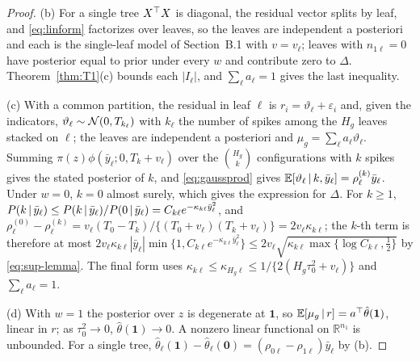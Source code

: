 \begin{proof}
(b) For a single tree $X^{\top} X$ is diagonal, the residual vector splits by leaf, and \eqref{eq:linform} factorizes over leaves, so the leaves are independent a posteriori and each is the single-leaf model of Section~B.1 with $v=v_\ell$; leaves with $n_{1\ell}=0$ have posterior equal to prior under every $w$ and contribute zero to $\Delta$. Theorem~\ref{thm:T1}(c) bounds each $|I_\ell|$, and $\sum_\ell a_\ell=1$ gives the last inequality.

(c) With a common partition, the residual in leaf $\ell$ is $r_i=\vartheta_\ell+\varepsilon_i$ and, given the indicators, $\vartheta_\ell\sim\mathcal{N}(0,T_{k_\ell})$ with $k_\ell$ the number of spikes among the $H_g$ leaves stacked on $\ell$; the leaves are independent a posteriori and $\mu_g=\sum_\ell a_\ell\vartheta_\ell$. Summing $\pi(z)\phi(\bar y_\ell;0,T_k+v_\ell)$ over the $\binom{H_g}{k}$ configurations with $k$ spikes gives the stated posterior of $k$, and \eqref{eq:gaussprod} gives $\mathbb{E}[\vartheta_\ell\,\vert\, k,\bar y_\ell]=\rho^{(k)}_\ell\bar y_\ell$. Under $w=0$, $k=0$ almost surely, which gives the expression for $\Delta$. For $k\ge1$, $P(k\,\vert\,\bar y_\ell)\le P(k\,\vert\,\bar y_\ell)/P(0\,\vert\,\bar y_\ell)=C_{k\ell}e^{-\kappa_{k\ell}\bar y_\ell^2}$, and $\rho^{(0)}_\ell-\rho^{(k)}_\ell=v_\ell(T_0-T_k)/\{(T_0+v_\ell)(T_k+v_\ell)\}=2v_\ell\kappa_{k\ell}$; the $k$-th term is therefore at most $2v_\ell\kappa_{k\ell}|\bar y_\ell|\min\{1,C_{k\ell}e^{-\kappa_{k\ell}\bar y_\ell^2}\}\le2v_\ell\sqrt{\kappa_{k\ell}\max\{\log C_{k\ell},\tfrac12\}}$ by \eqref{eq:sup-lemma}. The final form uses $\kappa_{k\ell}\le\kappa_{H_g\ell}\le1/\{2(H_g\tau_0^2+v_\ell)\}$ and $\sum_\ell a_\ell=1$.

(d) With $w=1$ the posterior over $z$ is degenerate at $\mathbf 1$, so $\mathbb{E}[\mu_g\,\vert\, r]=a^{\top}\hat\theta(\mathbf 1)$, linear in $r$; as $\tau_0^2\to0$, $\hat\theta(\mathbf 1)\to0$. A nonzero linear functional on $\mathbb R^{n_1}$ is unbounded. For a single tree, $\hat\theta_\ell(\mathbf 1)-\hat\theta_\ell(\mathbf 0)=(\rho_{0\ell}-\rho_{1\ell})\bar y_\ell$ by (b).
\end{proof}

